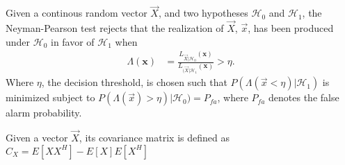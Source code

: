 \documentclass[a4paper, openany, oneside]{memoir}
\begin{document}
\begin{blockDefinition}
Given a continous random vector $\vec{X}$, and two hypotheses $\mathcal{H}_0$ and $\mathcal{H}_1$, the Neyman-Pearson test rejects that the realization of $\vec{X}$, $\vec{x}$, has been produced under $\mathcal{H}_0$ in favor of $\mathcal{H}_1$
when
\begin{align*}
    \Lambda (\mathbf{x}) &= \frac{L_{\vec{X} | \mathcal{H}_0} (\mathbf{x})}{L_{(\vec{X} | \mathcal{H}_1}(\mathbf{x})} > \eta. 
\end{align*}
Where $\eta$, the decision threshold, is chosen such that $P(\Lambda(\vec{x} < \eta) | \mathcal{H}_1)$ is minimized subject to $P(\Lambda(\vec{x}) > \eta) | \mathcal{H}_0) = P_{fa}$, where $P_{fa}$ denotes the false alarm probability. %
\end{blockDefinition}

\begin{blockDefinition}
Given a vector $\vec{X}$, its covariance matrix is defined as $C_{X} = E\left[XX^H\right]-E\left[X\right]E\left[X^H\right]$
\end{blockDefinition}
\end{document}
